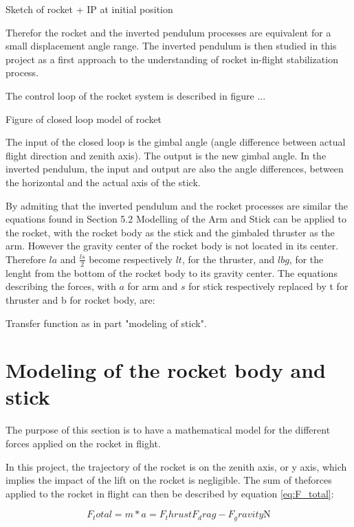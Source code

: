  Sketch of rocket + IP at initial position

Therefor the rocket and the inverted pendulum processes are equivalent for a small displacement angle range. The inverted pendulum is then studied in this project as a first approach to the understanding of rocket in-flight stabilization process.

The control loop of the rocket system is described in figure ...

Figure of closed loop model of rocket

The input of the closed loop is the gimbal angle (angle difference between actual flight direction and zenith axis). The output is the new gimbal angle. In the inverted pendulum, the input and output are also the angle differences, between the horizontal and the actual axis of the stick. 

By admiting that the inverted pendulum and the rocket processes are similar the equations found in Section 5.2 Modelling of the Arm and Stick can be applied to the rocket, with the rocket body as the stick and the gimbaled thruster as the arm. However the gravity center of the rocket body is not located in its center. Therefore $la$ and $\frac{ls}{2}$ become respectively $lt$, for the thruster, and $lbg$, for the lenght from the bottom of the rocket body to its gravity center. The equations describing the forces, with $a$ for arm and $s$ for stick respectively replaced by t for thruster and b for rocket body, are:

Transfer function as in part "modeling of stick".

	\section{Modeling of the rocket body and stick}
	
The purpose of this section is to have a mathematical model for the different forces applied on the rocket in flight. 

In this project, the trajectory of the rocket is on the zenith axis, or y axis, which implies the impact of the lift on the rocket is negligible. The sum of theforces applied to the rocket in flight can then be described by equation \eqref{eq:F_total}:

\begin{equation}
F_total = m*a = F_thrust  F_drag - F_gravity \si{\newton} \label{eq:F_total}
\end{equation}
\startexplain
{}
\stopexplain

